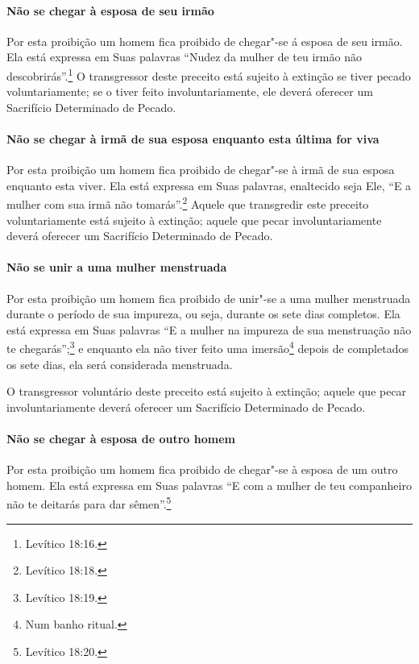 \begin{multicols}{2}
\paragraph{Não se chegar à esposa de seu irmão}

Por esta proibição um homem fica proibido de chegar"-se á esposa de seu
irmão. Ela está expressa em Suas palavras ``Nudez da mulher de teu
irmão não descobrirás''.\footnote{Levítico 18:16.} O transgressor deste preceito
está sujeito à extinção se tiver pecado voluntariamente; se o tiver
feito involuntariamente, ele deverá oferecer um Sacrifício Determinado
de Pecado.

\paragraph{Não se chegar à irmã de sua esposa enquanto esta última for viva}

Por esta proibição um homem fica proibido de chegar"-se à irmã de sua
esposa enquanto esta viver. Ela está expressa em Suas palavras,
enaltecido seja Ele, ``E a mulher com sua irmã não tomarás''.\footnote{Levítico
18:18.} Aquele que transgredir este preceito voluntariamente está
sujeito à extinção; aquele que pecar involuntariamente deverá oferecer
um Sacrifício Determinado de Pecado.

\paragraph{Não se unir a uma mulher menstruada}

Por esta proibição um homem fica proibido de unir"-se a uma mulher
menstruada durante o período de sua impureza, ou seja, durante os sete
dias completos. Ela está expressa em Suas palavras ``E a mulher na impureza
de sua menstruação não te chegarás'';\footnote{Levítico 18:19.} e enquanto ela
não tiver feito uma imersão\footnote{Num banho ritual.} depois de completados
os sete dias, ela será considerada menstruada.

O transgressor voluntário deste preceito está sujeito à extinção; aquele
que pecar involuntariamente deverá oferecer um Sacrifício Determinado de
Pecado.

\paragraph{Não se chegar à esposa de outro homem}

Por esta proibição um homem fica proibido de chegar"-se à esposa de um
outro homem. Ela está expressa em Suas palavras ``E com a mulher de teu
companheiro não te deitarás para dar sêmen''.\footnote{Levítico 18:20.}


\end{multicols}
